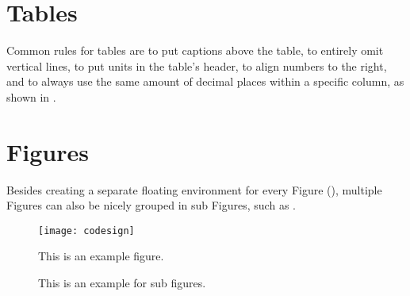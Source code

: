 \section{Tables}
\begin{table}[t]
  \caption{A very simple example table.}
  \label{tab:example}
  \centering
\end{table}

Common rules for tables are to put captions above the table, to entirely omit
vertical lines, to put units in the table's header, to align numbers to the
right, and to always use the same amount of decimal places within a specific
column, as shown in .

\section{Figures}
Besides creating a separate floating environment for every Figure
(), multiple Figures can also be nicely grouped in sub
Figures, such as .

\begin{figure}[t]
  \begin{center}
    \texttt{[image: codesign]}
  \end{center}
  \caption{This is an example figure.}
  \label{fig:example}
\end{figure}

\begin{figure}[t]
  \begin{center}
    \hfill
    \hfill
    \hfill\null
  \end{center}
  \caption{This is an example for sub figures.}
  \label{fig:subfig}
\end{figure}

